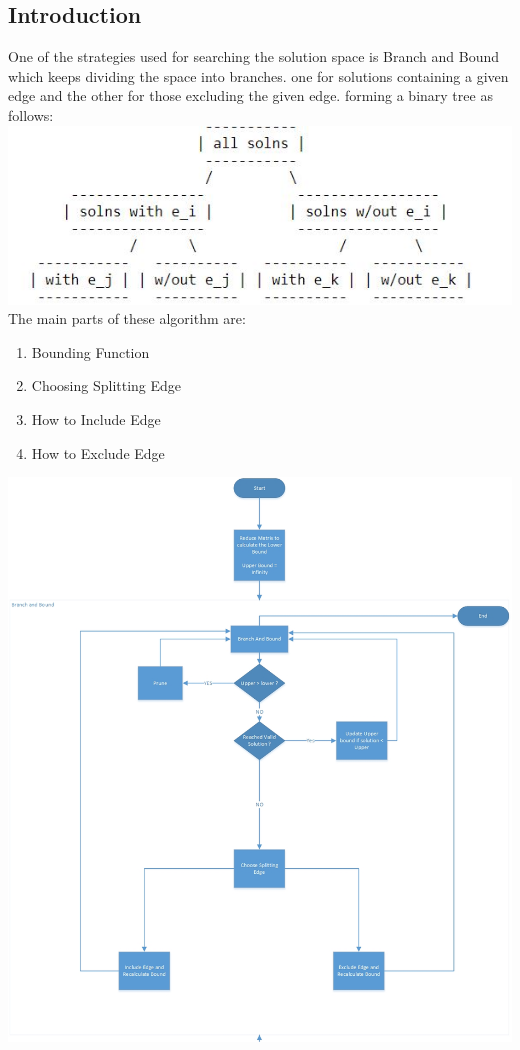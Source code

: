\documentclass[11pt, english]{article}
\begin{document}
\subsection{Introduction}
One of the strategies used for searching the solution space is Branch and Bound which keeps dividing the space into branches. one for solutions containing a given edge and the other for those excluding the given edge. forming a binary tree as follows:
\newline \newline
\includegraphics[width=\textwidth] {solution-tree.jpg}
\newline \newline
The main parts of these algorithm are:
\begin{enumerate}
    \item Bounding Function
    \item Choosing Splitting Edge
    \item How to Include Edge
    \item How to Exclude Edge
\end{enumerate}

\includegraphics[width = \textwidth]{bnb-flow.jpg}
\end{document}
